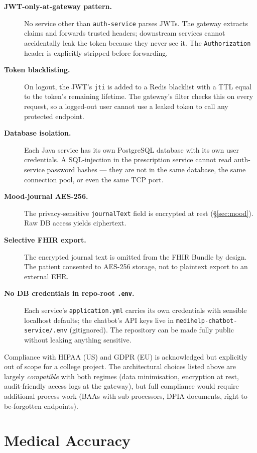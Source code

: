 \documentclass[12pt]{caltech_thesis}
\begin{document}
\begin{description}
    \item[\textbf{JWT-only-at-gateway pattern.}] No service other than
    \texttt{auth-service} parses JWTs. The gateway extracts claims and
    forwards trusted headers; downstream services cannot accidentally
    leak the token because they never see it. The
    \texttt{Authorization} header is explicitly stripped before
    forwarding.
    \item[\textbf{Token blacklisting.}] On logout, the JWT's \texttt{jti}
    is added to a Redis blacklist with a TTL equal to the token's
    remaining lifetime. The gateway's filter checks this on every
    request, so a logged-out user cannot use a leaked token to call any
    protected endpoint.
    \item[\textbf{Database isolation.}] Each Java service has its own
    PostgreSQL database with its own user credentials. A SQL-injection
    in the prescription service cannot read auth-service password hashes
    --- they are not in the same database, the same connection pool, or
    even the same TCP port.
    \item[\textbf{Mood-journal AES-256.}] The privacy-sensitive
    \texttt{journalText} field is encrypted at rest (\S\ref{sec:mood}).
    Raw DB access yields ciphertext.
    \item[\textbf{Selective FHIR export.}] The encrypted journal text is
    omitted from the FHIR Bundle by design. The patient consented to
    AES-256 storage, not to plaintext export to an external EHR.
    \item[\textbf{No DB credentials in repo-root \texttt{.env}.}] Each
    service's \texttt{application.yml} carries its own credentials with
    sensible localhost defaults; the chatbot's API keys live in
    \texttt{medihelp-chatbot-service/.env} (gitignored). The repository
    can be made fully public without leaking anything sensitive.
\end{description}

Compliance with HIPAA (US) and GDPR (EU) is acknowledged but explicitly
out of scope for a college project. The architectural choices listed
above are largely \textit{compatible} with both regimes (data
minimisation, encryption at rest, audit-friendly access logs at the
gateway), but full compliance would require additional process work
(BAAs with sub-processors, DPIA documents, right-to-be-forgotten
endpoints).

\section{Medical Accuracy}
\end{document}
